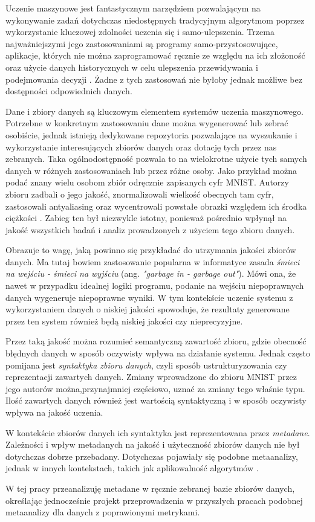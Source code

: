 Uczenie maszynowe jest fantastycznym narzędziem pozwalającym na wykonywanie zadań dotychczas niedostępnych tradycyjnym algorytmom poprzez wykorzystanie kluczowej zdolności uczenia się i samo-ulepszenia.
Trzema najważniejszymi jego zastosowaniami są programy samo-przystosowujące, aplikacje, których nie można zaprogramować ręcznie ze względu na ich złożoność oraz użycie danych historycznych w celu ulepszenia przewidywania i podejmowania decyzji \cite{mitchell1997machine}.
Żadne z tych zastosowań nie byłoby jednak możliwe bez dostępności odpowiednich danych.

Dane i zbiory danych są kluczowym elementem systemów uczenia maszynowego.
Potrzebne w konkretnym zastosowaniu dane można wygenerować lub zebrać osobiście, jednak istnieją dedykowane repozytoria pozwalające na wyszukanie i wykorzystanie interesujących zbiorów danych oraz dotację tych przez nas zebranych.
Taka ogólnodostępność pozwala to na wielokrotne użycie tych samych danych w różnych zastosowaniach lub przez różne osoby.
Jako przykład można podać znany wielu osobom zbiór odręcznie zapisanych cyfr MNIST.
Autorzy zbioru zadbali o jego jakość, znormalizowali wielkość obecnych tam cyfr, zastosowali antyaliasing oraz wycentrowali powstałe obrazki względem ich środka ciężkości \cite{mnist}.
Zabieg ten był niezwykle istotny, ponieważ pośrednio wpłynął na jakość wszystkich badań i analiz prowadzonych z użyciem tego zbioru danych.

Obrazuje to wagę, jaką powinno się przykładać do utrzymania jakości zbiorów danych.
Ma tutaj bowiem zastosowanie popularna w informatyce zasada \textit{śmieci na wejściu - śmieci na wyjściu} (ang. \textit{"garbage in - garbage out"}).
Mówi ona, że nawet w przypadku idealnej logiki programu, podanie na wejściu niepoprawnych danych wygeneruje niepoprawne wyniki.
W tym kontekście uczenie systemu z wykorzystaniem danych o niskiej jakości spowoduje, że rezultaty generowane przez ten system również będą niskiej jakości czy nieprecyzyjne.

Przez taką jakość można rozumieć semantyczną zawartość zbioru, gdzie obecność błędnych danych w sposób oczywisty wpływa na działanie systemu.
Jednak często pomijana jest \textit{syntaktyka zbioru danych}, czyli sposób ustrukturyzowania czy reprezentacji zawartych danych.
Zmiany wprowadzone do zbioru MNIST przez jego autorów można,przynajmniej częściowo, uznać za zmiany tego właśnie typu.
Ilość zawartych danych również jest wartością syntaktyczną i w sposób oczywisty wpływa na jakość uczenia.

W kontekście zbiorów danych ich syntaktyka jest reprezentowana przez \textit{metadane}.
Zależności i wpływ metadanych na jakość i użyteczność zbiorów danych nie był dotychczas dobrze przebadany.
Dotychczas pojawiały się podobne metaanalizy, jednak w innych kontekstach, takich jak aplikowalność algorytmów \cite{brazdil1994characterizing}.

W tej pracy przeanalizuję metadane w ręcznie zebranej bazie zbiorów danych, określając jednocześnie projekt przeprowadzenia w przyszłych pracach podobnej metaanalizy dla danych z poprawionymi metrykami.
